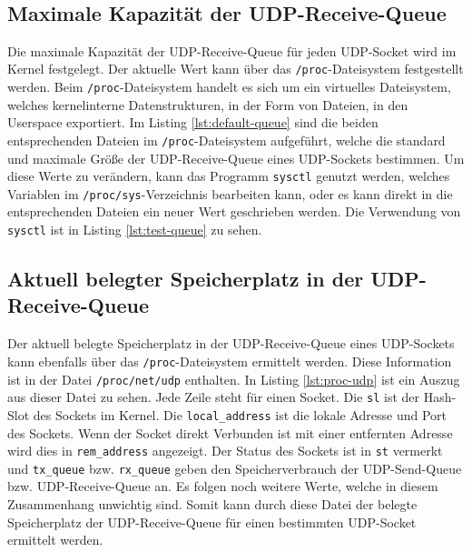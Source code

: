 \documentclass[a4paper, 12pt, BCOR10mm, DIV12, toc=bibliography, toc=listof, german]{scrbook}
\begin{document}
		$~$\\
		\subsection*{Maximale Kapazität der UDP-Receive-Queue} %

		
		

		Die maximale Kapazität der UDP-Receive-Queue für jeden UDP-Socket wird im Kernel festgelegt. Der
		aktuelle Wert kann über das \texttt{/proc}-Dateisystem festgestellt werden. Beim
		\texttt{/proc}-Dateisystem \cite{benvenuti2005} handelt es sich um ein virtuelles Dateisystem,
		welches kernelinterne Datenstrukturen, in der Form von Dateien, in den Userspace exportiert. Im
		Listing \ref{lst:default-queue} sind die beiden entsprechenden Dateien im
		\texttt{/proc}-Dateisystem aufgeführt, welche die standard und maximale Größe der
		UDP-Receive-Queue eines UDP-Sockets bestimmen. Um diese Werte zu verändern, kann das Programm
		\texttt{sysctl} genutzt werden, welches Variablen im \texttt{/proc/sys}-Verzeichnis bearbeiten
		kann, oder es kann direkt in die entsprechenden Dateien ein neuer Wert geschrieben werden. Die
		Verwendung von \texttt{sysctl} ist in Listing \ref{lst:test-queue} zu sehen.

		\subsection*{Aktuell belegter Speicherplatz in der UDP-Receive-Queue} %

		Der aktuell belegte Speicherplatz in der UDP-Receive-Queue eines UDP-Sockets kann ebenfalls über
		das \texttt{/proc}-Dateisystem ermittelt werden. Diese Information ist in der Datei
		\texttt{/proc/net/udp} enthalten. In Listing \ref{lst:proc-udp} ist ein Auszug aus dieser Datei
		zu sehen. Jede Zeile steht für einen Socket. Die \texttt{sl} ist der Hash-Slot des Sockets im
		Kernel. Die \texttt{local\_address} ist die lokale Adresse und Port des Sockets. Wenn der Socket
		direkt Verbunden ist mit einer entfernten Adresse wird dies in \texttt{rem\_address} angezeigt.
		Der Status des Sockets ist in \texttt{st} vermerkt und \texttt{tx\_queue} bzw.
		\texttt{rx\_queue} geben den Speicherverbrauch der UDP-Send-Queue bzw. UDP-Receive-Queue an. Es
		folgen noch weitere Werte, welche in diesem Zusammenhang unwichtig sind. Somit kann durch diese
		Datei der belegte Speicherplatz der UDP-Receive-Queue für einen bestimmten UDP-Socket ermittelt werden.
\end{document}
